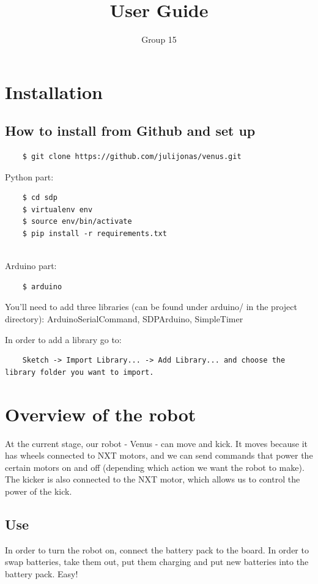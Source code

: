 \documentclass[12pt]{article}
\title{User Guide}
\author{Group 15}
\begin{document}
\graphicspath{ {images/} }
	\maketitle
	\setlength{\parindent}{0pt}

 \section{Installation} 
  \bigskip
 

 \subsection{How to install from Github and set up} 
 
 \begin{lstlisting}
	$ git clone https://github.com/julijonas/venus.git
\end{lstlisting}
	Python part:
	\begin{lstlisting}
	$ cd sdp
	$ virtualenv env
	$ source env/bin/activate
	$ pip install -r requirements.txt
	
	\end{lstlisting}

	Arduino part:
	\begin{lstlisting}
	$ arduino
	\end{lstlisting}
	You'll need to add three libraries (can be found under arduino/ in the project directory): ArduinoSerialCommand, SDPArduino, SimpleTimer
	\bigskip

	In order to add a library go to: 
	\begin{lstlisting}
	Sketch -> Import Library... -> Add Library... and choose the library folder you want to import.
	\end{lstlisting}

\section{Overview of the robot}
        At the current stage, our robot - Venus - can move and kick. It moves because it has wheels connected to NXT motors, and we can send commands that power the certain motors on and off (depending which action we want the robot to make). The kicker is also connected to the NXT motor, which allows us to control the power of the kick. 
      
	\subsection{Use}
	In order to turn the robot on, connect the battery pack to the board. 
        In order to swap batteries, take them out, put them charging and put new batteries into the battery pack. Easy!
\end{document}
